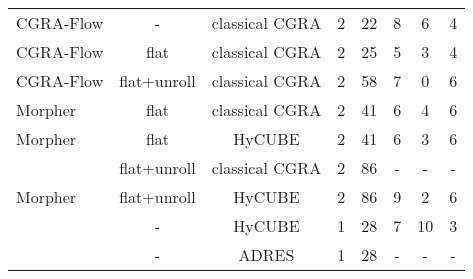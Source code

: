 \begin{table}
{\begin{tabular}{|l|c|c|c|c|c|c|c|}
 {CGRA-Flow}                                          & -                                    & classical CGRA                            & 2                              & 22                            & 8                          & 6                                   & 4\\ 
 {CGRA-Flow}                                          & flat                                 & classical CGRA                            & 2                              & 25                            & 5                          & 3                                   & 4 \\ 
 {CGRA-Flow}                                          & flat+unroll                          & classical CGRA                            & 2                              & 58                            & 7                          & 0                                   & 6 \\
 {Morpher}                                            & {flat}                               & classical CGRA                            & 2                              & 41                            & 6                          & 4                                   & 6 \\ 
 {Morpher}                                            & {flat}                               & HyCUBE                               & 2                              & 41                            & 6                          & 3                                   & 6 \\
 \rowcolor{darkRed!50}{Morpher}                       & {flat+unroll}                        & classical CGRA                            & 2                              & 86                            & -                          & -                                   & - \\ 
 {Morpher}                                            & {flat+unroll}                        & HyCUBE                               & 2                              & 86                            & 9                          & 2                                   & 6 \\ 
 \rowcolor{darkOrange!50}{CGRA-ME}                    & {-}                                  & HyCUBE                               & 1                              & 28                            & 7                          & 10                                  & 3 \\
 \rowcolor{darkRed!50}{Pillars}                       & {-}                                  & ADRES                                & 1                              & 28                            & -                          & -                                   & - \\

\end{tabular}}
\end{table}
